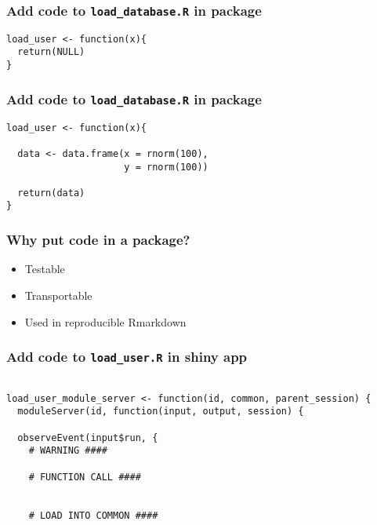 \documentclass[handout, aspectratio = 169, xcolor={dvipsnames}]{beamer}
\begin{document}
\begin{frame}[fragile]
\frametitle{Add code to \texttt{load\_database.R} in package}
\footnotesize{
\vspace{1mm}
\begin{Verbatim}
load_user <- function(x){
  return(NULL)
}

\end{Verbatim}
}
\end{frame} 


\begin{frame}[fragile]
\frametitle{Add code to \texttt{load\_database.R} in package}
\footnotesize{
\vspace{1mm}
\begin{Verbatim}
load_user <- function(x){
  
  data <- data.frame(x = rnorm(100),
                     y = rnorm(100))
  
  return(data)
}

\end{Verbatim}
}
\end{frame} 



\begin{frame}
\frametitle{Why put code in a package?}

\begin{itemize}
\item Testable
\item Transportable
\item Used in reproducible Rmarkdown
\end{itemize}

\end{frame} 


\begin{frame}[fragile]
\frametitle{Add code to \texttt{load\_user.R} in shiny app}
\footnotesize{
\vspace{1mm}
\begin{Verbatim}

load_user_module_server <- function(id, common, parent_session) {
  moduleServer(id, function(input, output, session) {

  observeEvent(input$run, {
    # WARNING ####

    # FUNCTION CALL ####
    
    
    # LOAD INTO COMMON ####

\end{Verbatim}
}
\end{frame} 
\end{document}
